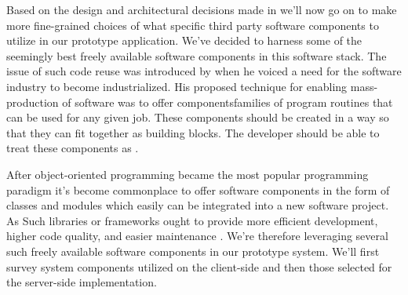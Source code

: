 Based on the design and architectural decisions made in 
 we'll now go on to make more fine-grained choices
of what specific third party software components to utilize in our prototype
application. We've decided to harness some of the seemingly best freely
available software components in this software stack. The issue of such code
reuse was introduced by \citet[]{mcilroy68} when he voiced a need
for the software industry to become industrialized. His proposed technique for
enabling mass-production of software was to offer components\dash{}families
of program routines that can be used for any given job. These components
should be created in a way so that they can fit together as building blocks.
The developer should be able to treat these components as %
.

After object-oriented programming became the most popular
programming paradigm%
it's become commonplace to offer software components in the form of classes
and modules which easily can be integrated into a new software project.
As 
Such libraries or frameworks ought to provide more efficient development,
higher code quality, and easier maintenance \citep[]{stroustrup96}.
We're therefore leveraging several such freely available software components
in our prototype system. We'll first survey system components utilized
on the client-side and then those selected for the server-side implementation.


